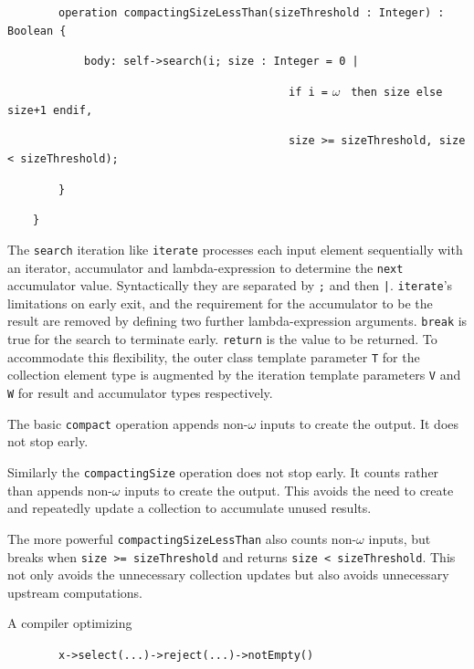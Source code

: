 \documentclass[
]{ceurart}
\begin{document}
\begin{description}[itemsep=-0.2cm]\small\begin{samepage}
\item ~~~~~~~~\verb!operation compactingSizeLessThan(sizeThreshold : Integer) : Boolean {!
\item ~~~~~~~~~~~~\verb!body: self->search(i; size : Integer = 0 |!
\item ~~~~~~~~~~~~~~~~~~~~~~~~~~~~~~~~~~~~~~~~~~~~\verb!if i =! $\omega$ \verb! then size else size+1 endif,!
\item ~~~~~~~~~~~~~~~~~~~~~~~~~~~~~~~~~~~~~~~~~~~~\verb!size >= sizeThreshold, size < sizeThreshold);!
\item ~~~~~~~~\verb!}!\item ~~~~\verb!}!
\end{samepage}\end{description}

The \verb!search! iteration like \verb!iterate! processes each input element sequentially with an iterator, accumulator and lambda-expression to determine the \verb!next! accumulator value. Syntactically they are separated by \verb!;! and then \verb!|!. \verb!iterate!'s limitations on early exit, and the requirement for the accumulator to be the result are removed by defining two further lambda-expression arguments. \verb!break! is true for the search to terminate early. \verb!return! is the value to be returned. To accommodate this flexibility, the outer class template parameter \verb!T! for the collection element type is augmented by the iteration template parameters \verb!V! and \verb!W! for result and accumulator types respectively.

The basic \verb!compact! operation appends non-$\omega$ inputs to create the output. It does not stop early.

Similarly the \verb!compactingSize! operation does not stop early. It counts rather than appends non-$\omega$ inputs to create the output. This avoids the need to create and repeatedly update a collection to accumulate unused results. 

The more powerful \verb!compactingSizeLessThan! also counts non-$\omega$ inputs, but breaks when \verb!size >= sizeThreshold! and returns \verb!size < sizeThreshold!. This not only avoids the unnecessary collection updates but also avoids unnecessary upstream computations.

A compiler optimizing

\begin{description}[itemsep=-0.2cm]\small
\item ~~~~~~~~\verb!x->select(...)->reject(...)->notEmpty()!
\end{description}
\end{document}
